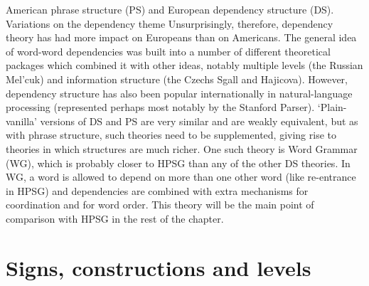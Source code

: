 \documentclass[output=paper]{langsci/langscibook}
\begin{document}
American phrase structure (PS) and European dependency structure (DS).  Variations on the dependency
theme Unsurprisingly, therefore, dependency theory has had more impact on Europeans than on
Americans. The general idea of word-word dependencies was built into a number of different
theoretical packages which combined it with other ideas, notably multiple levels (the Russian
Mel’cuk) and information structure (the Czechs Sgall and Hajicova). However, dependency structure
has also been popular internationally in natural-language processing (represented perhaps most
notably by the Stanford Parser).  ‘Plain-vanilla’ versions of DS and PS are very similar and are
weakly equivalent, but as with phrase structure, such theories need to be supplemented, giving rise
to theories in which structures are much richer. One such theory is Word Grammar (WG), which is
probably closer to HPSG than any of the other DS theories. In WG, a word is allowed to depend on
more than one other word (like re-entrance in HPSG) and dependencies are combined with extra
mechanisms for coordination and for word order. This theory will be the main point of comparison
with HPSG in the rest of the chapter.


\section{Signs, constructions and levels}
\end{document}
